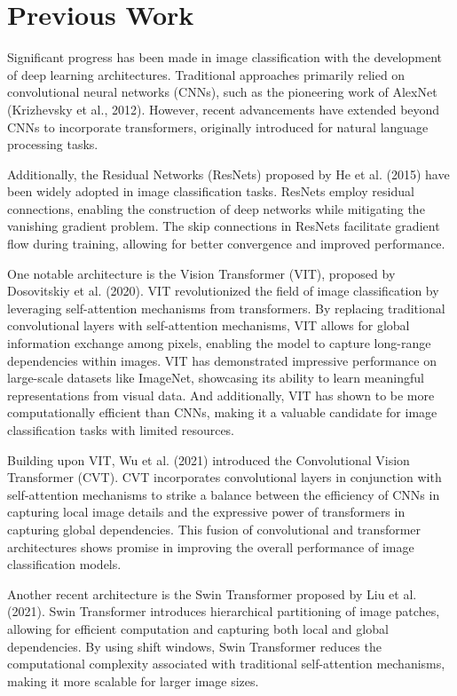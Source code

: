 \documentclass{article}
\begin{document}
\section{Previous Work}
Significant progress has been made in image classification with the development of deep learning architectures. Traditional approaches primarily relied on convolutional neural networks (CNNs), such as the pioneering work of AlexNet (Krizhevsky et al., 2012). However, recent advancements have extended beyond CNNs to incorporate transformers, originally introduced for natural language processing tasks.

Additionally, the Residual Networks (ResNets) proposed by He et al. (2015) have been widely adopted in image classification tasks. ResNets employ residual connections, enabling the construction of deep networks while mitigating the vanishing gradient problem. The skip connections in ResNets facilitate gradient flow during training, allowing for better convergence and improved performance.

One notable architecture is the Vision Transformer (VIT), proposed by Dosovitskiy et al. (2020). 
VIT revolutionized the field of image classification by leveraging self-attention mechanisms from transformers. 
By replacing traditional convolutional layers with self-attention mechanisms, VIT allows for global information exchange among pixels, enabling the model to capture long-range dependencies within images.
VIT has demonstrated impressive performance on large-scale datasets like ImageNet, showcasing its ability to learn meaningful representations from visual data. 
And additionally, VIT has shown to be more computationally efficient than CNNs, making it a valuable candidate for image classification tasks with limited resources.

Building upon VIT, Wu et al. (2021) introduced the Convolutional Vision Transformer (CVT). 
CVT incorporates convolutional layers in conjunction with self-attention mechanisms to strike a balance between the efficiency of CNNs in capturing local image details and the expressive power of transformers in capturing global dependencies. 
This fusion of convolutional and transformer architectures shows promise in improving the overall performance of image classification models.

Another recent architecture is the Swin Transformer proposed by Liu et al. (2021). 
Swin Transformer introduces hierarchical partitioning of image patches, allowing for efficient computation and capturing both local and global dependencies. 
By using shift windows, Swin Transformer reduces the computational complexity associated with traditional self-attention mechanisms, making it more scalable for larger image sizes.
\end{document}
